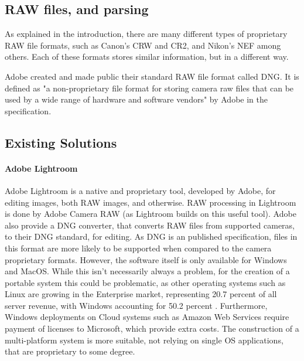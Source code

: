 \documentclass[10pt,a4paper]{article}
\begin{document}
\subsection{RAW files, and parsing}
% 


As explained in the introduction, there are many different types of proprietary RAW file formats, such as Canon's CRW and CR2, and Nikon's NEF among others.
Each of these formats stores similar information, but in a different way.

Adobe created and made public their standard RAW file format called DNG. It is defined as "a non-proprietary file format for storing camera raw files that
can be used by a wide range of hardware and software vendors" by Adobe in the specification. \cite{DNGSpec}


\subsection{Existing Solutions}

    \paragraph{Adobe Lightroom}
    Adobe Lightroom is a native and proprietary tool, developed by Adobe, for editing images, both RAW images, and otherwise.
    RAW processing in Lightroom is done by Adobe Camera RAW (as Lightroom builds on this useful tool). \cite{AdobeCameraRAW}
    Adobe also provide a DNG converter, that converts RAW files from supported cameras, to their DNG standard,
    for editing. As DNG is an published specification, files in this format are more likely to be supported
    when compared to the camera proprietary formats. However, the software itself is only available for Windows
    and MacOS.\cite{AdobeDNGConverter} While this isn't necessarily always a problem, for the creation of a portable system this could be problematic,
    as other operating systems such as Linux are growing in the Enterprise market, representing 20.7 percent of all server revenue, with Windows
    accounting for 50.2 percent \cite{LinuxServerGrowth}. Furthermore, Windows deployments on Cloud systems such as Amazon Web Services require
    payment of licenses to Microsoft, which provide extra costs. The construction of a multi-platform system is more suitable, not relying on
    single OS applications, that are proprietary to some degree.
\end{document}
